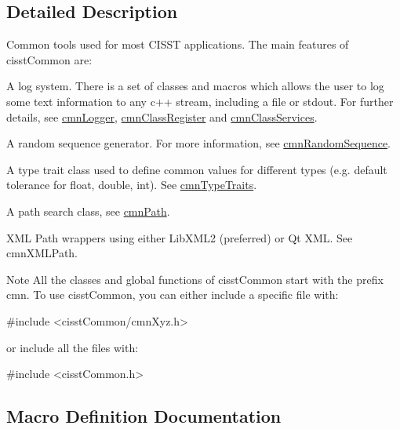 \subsection{Detailed Description}
Common tools used for most C\+I\+S\+S\+T applications. The main features of cisst\+Common are\+:


\begin{DoxyItemize}
\item A log system. There is a set of classes and macros which allows the user to log some text information to any c++ stream, including a file or stdout. For further details, see \hyperlink{classcmn_logger}{cmn\+Logger}, \hyperlink{classcmn_class_register}{cmn\+Class\+Register} and \hyperlink{classcmn_class_services}{cmn\+Class\+Services}.
\item A random sequence generator. For more information, see \hyperlink{classcmn_random_sequence}{cmn\+Random\+Sequence}.
\item A type trait class used to define common values for different types (e.\+g. default tolerance for float, double, int). See \hyperlink{classcmn_type_traits}{cmn\+Type\+Traits}.
\item A path search class, see \hyperlink{classcmn_path}{cmn\+Path}.
\item X\+M\+L Path wrappers using either Lib\+X\+M\+L2 (preferred) or Qt X\+M\+L. See cmn\+X\+M\+L\+Path.
\end{DoxyItemize}

\begin{DoxyNote}{Note}
All the classes and global functions of cisst\+Common start with the prefix cmn. To use cisst\+Common, you can either include a specific file with\+: 
\begin{DoxyCode}
\textcolor{preprocessor}{#include <cisstCommon/cmnXyz.h>}
\end{DoxyCode}
 or include all the files with\+: 
\begin{DoxyCode}
\textcolor{preprocessor}{#include <cisstCommon.h>}
\end{DoxyCode}
 
\end{DoxyNote}


\subsection{Macro Definition Documentation}
\hypertarget{group__cisst_common_ga6a12b7031ea38ac5bf5937b8633c97ff}{}
